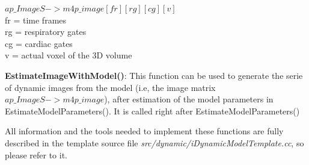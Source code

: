 \documentclass[a4paper, 11pt]{article}
\begin{document}
\begin{description}
$ap\_ImageS->m4p\_image[fr][rg][cg][v]$ \\
fr = time frames \\
rg = respiratory gates \\
cg = cardiac gates \\
 v = actual voxel of the 3D volume

\item \textbf{EstimateImageWithModel()}: This function can be used to generate the serie of dynamic images from the model (i.e, the image matrix $ap\_ImageS->m4p\_image$), after estimation of the model parameters in EstimateModelParameters(). It is called right after EstimateModelParameters()

All information and the tools needed to implement these functions are fully described in the template source file \textit{src/dynamic/iDynamicModelTemplate.cc}, so please refer to it.

\end{description}





\clearpage
\end{document}

